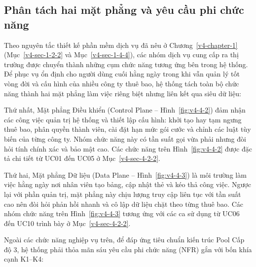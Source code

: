 
\subsection{Phân tách hai mặt phẳng và yêu cầu phi chức năng}\label{v4-sec-4-1-2}

Theo nguyên tắc thiết kế phần mềm dịch vụ đã nêu ở Chương~\ref{v4-chapter-1} (Mục~\ref{v4-sec-1-2-2} và Mục~\ref{v4-sec-1-4-4}), các nhóm dịch vụ cung cấp ra thị trường được chuyển thành những cụm chức năng tương ứng bên trong hệ thống. Để phục vụ ổn định cho người dùng cuối hằng ngày trong khi vẫn quản lý tốt vòng đời và cấu hình của nhiều công ty thuê bao, hệ thống tách toàn bộ chức năng thành hai mặt phẳng làm việc riêng biệt nhưng liên kết qua siêu dữ liệu:

Thứ nhất, Mặt phẳng Điều khiển (Control Plane -- Hình~\ref{fig:v4-4-2}) đảm nhận các công việc quản trị hệ thống và thiết lập cấu hình: khởi tạo hay tạm ngưng thuê bao, phân quyền thành viên, cài đặt hạn mức gói cước và chỉnh các luật tùy biến của từng công ty. Nhóm chức năng này có tần suất gọi vừa phải nhưng đòi hỏi tính chính xác và bảo mật cao. Các chức năng trên Hình~\ref{fig:v4-4-2} được đặc tả chi tiết từ UC01 đến UC05 ở Mục~\ref{v4-sec-4-2-2}.


Thứ hai, Mặt phẳng Dữ liệu (Data Plane -- Hình~\ref{fig:v4-4-3}) là môi trường làm việc hằng ngày nơi nhân viên tạo bảng, cập nhật thẻ và kéo thả công việc. Ngược lại với phần quản trị, mặt phẳng này chịu lượng truy cập liên tục với tần suất cao nên đòi hỏi phản hồi nhanh và cô lập dữ liệu chặt theo từng thuê bao. Các nhóm chức năng trên Hình~\ref{fig:v4-4-3} tương ứng với các ca sử dụng từ UC06 đến UC10 trình bày ở Mục~\ref{v4-sec-4-2-2}.


Ngoài các chức năng nghiệp vụ trên, để đáp ứng tiêu chuẩn kiến trúc Pool Cấp độ 3, hệ thống phải thỏa mãn sáu yêu cầu phi chức năng (NFR) gắn với bốn khía cạnh K1--K4:


